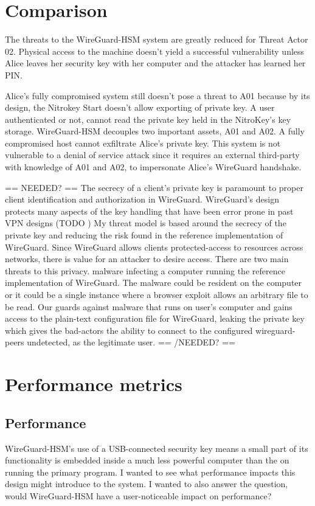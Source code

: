 \documentclass [11pt, proquest] {uwthesis}[2020/02/24]
\begin{document}
\section{Comparison}
The threats to the WireGuard-HSM system are greatly reduced for Threat Actor 02. Physical access to the machine doesn't yield a successful vulnerability unless Alice leaves her security key with her computer and the attacker has learned her PIN.

Alice's fully compromised system still doesn't pose a threat to A01 because by its design, the Nitrokey Start doesn't allow exporting of private key. A user authenticated or not, cannot read the private key held in the NitroKey's key storage.
WireGuard-HSM decouples two important assets, A01 and A02. A fully compromised host cannot exfiltrate Alice's private key. This system is not vulnerable to a denial of service attack since it requires an external third-party with knowledge of A01 and A02, to impersonate Alice's WireGuard handshake.



== NEEDED? ==
The secrecy of a client's private key is paramount to proper client identification and authorization in WireGuard. WireGuard's design protects many aspects of the key handling that have been error prone in past VPN designs (TODO )
My threat model is based around the secrecy of the private key and reducing the risk found in the reference implementation of WireGuard. Since WireGuard allows clients protected-access to resources across networks, there is value for an attacker to desire access. 
There are two main threats to this privacy.  malware infecting a computer running the reference implementation of WireGuard. The malware could be resident on the computer or it could be a single instance where a browser exploit allows an arbitrary file to be read. Our guards against malware that runs on user's computer and gains access to the plain-text configuration file for WireGuard, leaking the private key which gives the bad-actors the ability to connect to the configured wireguard-peers undetected, as the legitimate user.
== /NEEDED? ==



\section{Performance metrics}

\subsection{Performance}
WireGuard-HSM's use of a USB-connected security key means a small part of its functionality is embedded inside a much less powerful computer than the on running the primary program. I wanted to see what performance impacts this design might introduce to the system. I wanted to also answer the question, would WireGuard-HSM have a user-noticeable impact on performance?
\end{document}
